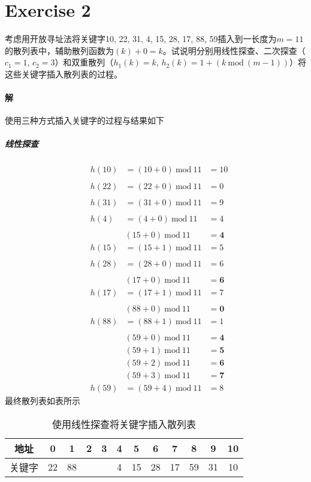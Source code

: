 \documentclass{article}
\begin{document}
\section*{Exercise 2}
考虑用开放寻址法将关键字10, 22, 31, 4, 15, 28, 17, 88, 59插入到一长度为$m = 11$的散列表中，辅助散列函数为$(k) + 0 = k$。试说明分别用线性探查、二次探查（$c_1 = 1,\,c_2 = 3$）和双重散列（$h_1(k) = k,\,
h_2(k) = 1 + (k\ \text{mod}\ (m − 1))$）将这些关键字插入散列表的过程。

\paragraph{解}
使用三种方式插入关键字的过程与结果如下
\subparagraph{线性探查}
\begin{align*}
    &h(10) &= (10 + 0) \ \text{mod}\  11 &= 10 \\
    \\
    &h(22) &= (22 + 0) \ \text{mod}\  11 &= 0 \\
    \\
    &h(31) &= (31 + 0) \ \text{mod}\  11 &= 9 \\
    \\
    &h(4) &= (4 + 0) \ \text{mod}\  11 &= 4 \\
    \\
    && (15 + 0) \ \text{mod}\  11 &= \mathbf{4} \\
    &h(15) &= (15 + 1) \ \text{mod}\  11 &= 5 \\
    \\
    &h(28) &= (28 + 0) \ \text{mod}\  11 &= 6 \\
    \\
    &&(17 + 0) \ \text{mod}\  11 &= \mathbf{6} \\
    &h(17) &= (17 + 1) \ \text{mod}\  11 &= 7 \\
    \\
    &&(88 + 0) \ \text{mod}\  11 &= \mathbf{0} \\
    &h(88) &= (88 + 1) \ \text{mod}\  11 &= 1 \\
    \\
    &&(59 + 0) \ \text{mod}\  11 &= \mathbf{4} \\
    &&(59 + 1) \ \text{mod}\  11 &= \mathbf{5} \\
    &&(59 + 2) \ \text{mod}\  11 &= \mathbf{6} \\
    &&(59 + 3) \ \text{mod}\  11 &= \mathbf{7} \\
    &h(59) &= (59 + 4) \ \text{mod}\  11 &= 8
\end{align*}
最终散列表如表所示
\begin{table}[H]
    \centering
    \begin{tabular}{|c|c|c|c|c|c|c|c|c|c|c|c|}
    \hline
    地址 & 0 & 1 & 2 & 3 & 4 & 5 & 6 & 7 & 8 & 9 & 10 \\ \hline
    关键字 & 22 & 88 &  &  & 4 & 15 & 28 & 17 & 59 & 31 & 10 \\ \hline
    \end{tabular}
    \caption{使用线性探查将关键字插入散列表}
\end{table}
\end{document}
